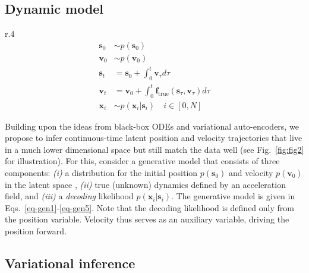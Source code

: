 \documentclass{article}
\newcommand{\x}{\mathbf{x}}
\renewcommand{\v}{\mathbf{v}}
\newcommand{\f}{\mathbf{f}}
\newcommand{\0}{\mathbf{0}}
\newcommand{\s}{\mathbf{s}}
\begin{document}
\subsection{Dynamic model}
\begin{wrapfigure}[9]{r}{.4\textwidth}
    \vspace*{-0.9cm}
\begin{align}
    \s_0 &\sim p(\s_0) \label{eq-gen1}\\
    \v_0 &\sim p(\v_0)  \\
    \s_t &= \s_0 + \int_{0}^{t} \v_\tau d\tau \\
    \v_t &= \v_0 + \int_{0}^{t} \f_{\text{true}}(\s_\tau,\v_\tau) d\tau \\ 
    \x_i &\sim p(\x_i|\s_i) \quad i \in [0,N] \label{eq-gen5}
\end{align}
\end{wrapfigure}
Building upon the ideas from black-box ODEs and variational auto-encoders, we propose to infer continuous-time latent position and velocity trajectories that live in a much lower dimensional space but still match the data well (see Fig.~\ref{fig:fig2} for illustration). 
For this, consider a generative model that consists of three components: {\em (i)} a distribution for the initial position $p(\s_0)$ and velocity $p(\v_0)$ in the latent space , {\em (ii)} true (unknown) dynamics defined by an acceleration field, and {\em (iii)} a {\em decoding} likelihood $p(\x_i|\s_i)$.
The generative model is given in Eqs.~\ref{eq-gen1}-\ref{eq-gen5}. Note that the decoding likelihood is defined only from the position variable. Velocity thus serves as an auxiliary variable, driving the position forward. 

\subsection{Variational inference}
\end{document}
